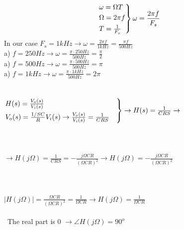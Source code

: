 \documentclass[english]{article}
\begin{document}
\section{}
$$
\begin{rcases}
\omega=\Omega T\\
\Omega=2 \pi f \\
T=\frac{1}{F_s}
\end{rcases}
\omega=\frac{2 \pi f}{F_s}
$$
In our case $F_s=1kHz \rightarrow \omega=\frac{2 \pi f}{1kHz}=\frac{\pi f}{500Hz}$\\
a) $f=250Hz \rightarrow \omega=\frac{\pi \cdot 250Hz}{500Hz}=\frac{\pi}{2}$\\
a) $f=500Hz \rightarrow \omega=\frac{\pi \cdot 500Hz}{500Hz}=\pi$\\
a) $f=1kHz \rightarrow \omega=\frac{\pi \cdot 1kHz}{500Hz}=2 \pi$\\

\section{}
$
\begin{rcases}
 H(s)=\frac{ V_o(s)}{V_i (s)}\\
  V_o(s)=\frac{1/SC}{R} V_i(s)
\rightarrow \frac{ V_o(s)}{V_i (s)}=\frac{1}{CRS} \quad
\end{rcases}
\rightarrow	H(s)=\frac{1}{CRS}  \rightarrow
$\\\\\\\\
$
\rightarrow H(j \Omega)=\frac{1}{CRS} =- \frac{j \Omega CR}{(\Omega CR)^2} \rightarrow H(j \Omega)=
- \frac{j \Omega CR}{(\Omega CR)^2}$\\\\\\\\
$
| H(j \Omega)|=\frac{\Omega CR}{(\Omega CR)^2}=\frac{1}{\Omega CR} \rightarrow H(j \Omega)=
\frac{1}{\Omega CR} $\\\\\
The real part is 0 $\rightarrow \angle H(j \Omega)=90^o$
\end{document}
